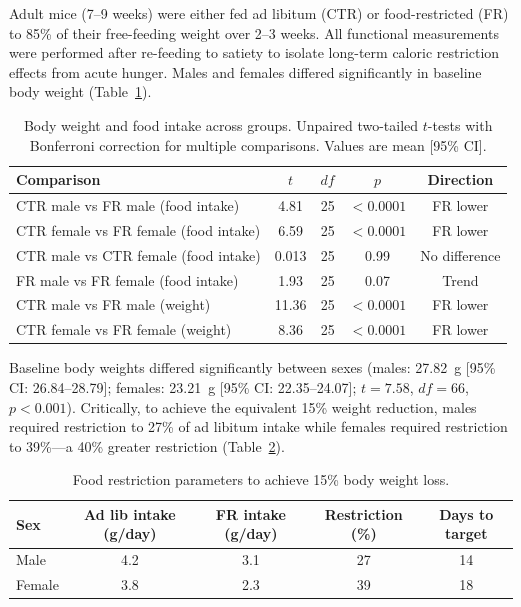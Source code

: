 \documentclass[11pt]{article}
\begin{document}
Adult mice (7--9 weeks) were either fed ad libitum (CTR) or food-restricted (FR) to 85\% of their free-feeding weight over 2--3 weeks. All functional measurements were performed after re-feeding to satiety to isolate long-term caloric restriction effects from acute hunger. Males and females differed significantly in baseline body weight (Table~\ref{tab:weight}).

\begin{table}[H]
\centering
\caption{Body weight and food intake across groups. Unpaired two-tailed $t$-tests with Bonferroni correction for multiple comparisons. Values are mean [95\% CI].}
\label{tab:weight}
\begin{tabular}{lcccc}
\toprule
Comparison & $t$ & $df$ & $p$ & Direction \\
\midrule
CTR male vs FR male (food intake) & 4.81 & 25 & $< 0.0001$ & FR lower \\
CTR female vs FR female (food intake) & 6.59 & 25 & $< 0.0001$ & FR lower \\
CTR male vs CTR female (food intake) & 0.013 & 25 & 0.99 & No difference \\
FR male vs FR female (food intake) & 1.93 & 25 & 0.07 & Trend \\
CTR male vs FR male (weight) & 11.36 & 25 & $< 0.0001$ & FR lower \\
CTR female vs FR female (weight) & 8.36 & 25 & $< 0.0001$ & FR lower \\
\bottomrule
\end{tabular}
\end{table}

Baseline body weights differed significantly between sexes (males: 27.82~g [95\% CI: 26.84--28.79]; females: 23.21~g [95\% CI: 22.35--24.07]; $t = 7.58$, $df = 66$, $p < 0.001$). Critically, to achieve the equivalent 15\% weight reduction, males required restriction to 27\% of ad libitum intake while females required restriction to 39\%---a 40\% greater restriction (Table~\ref{tab:restriction_level}).

\begin{table}[H]
\centering
\caption{Food restriction parameters to achieve 15\% body weight loss.}
\label{tab:restriction_level}
\begin{tabular}{lcccc}
\toprule
Sex & Ad lib intake (g/day) & FR intake (g/day) & Restriction (\%) & Days to target \\
\midrule
Male & 4.2 & 3.1 & 27 & 14 \\
Female & 3.8 & 2.3 & 39 & 18 \\
\bottomrule
\end{tabular}
\end{table}
\end{document}
